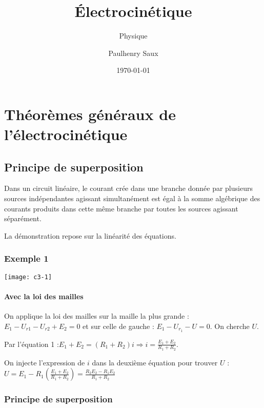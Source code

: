 \documentclass[french]{yLectureNote}
\title{Électrocinétique}
\subtitle{Physique}
\author{Paulhenry Saux}
\date{\today}
\begin{document}
\setcounter{chapter}{2}
	\chapter{Théorèmes généraux de l'électrocinétique}
\section{Principe de superposition}
%
\begin{theorem}
 Dans un circuit linéaire, le courant crée dans une branche donnée par plusieurs sources indépendantes agissant simultanément est égal à la somme algébrique des courants produits dans cette m\^eme branche par toutes les sources agissant séparément.
\end{theorem}
La démonstration repose sur la linéarité des équations.
\subsection{Exemple 1}
\texttt{[image: c3-1]}
\subsubsection{Avec la loi des mailles}

On applique la loi des mailles sur la maille la plus grande : $E_1-U_{r1}-U_{r2} + E_2 = 0$ et sur celle de gauche : $E_1-U_{r_1} - U = 0$. On cherche $U$.

Par l'équation 1 :$E_1+E_2=(R_1+R_2)i\Rightarrow i = \frac{E_1+E_2}{R_1+R_2}$.

On injecte l'expression de $i$ dans la deuxième équation pour trouver $U$ : $U = E_1-R_1(\frac{E_1+E_2}{R_1+R_2}) = \frac{R_2E_2-R_1E_2}{R_1+R_2}$

\subsection{Principe de superposition}
\end{document}
